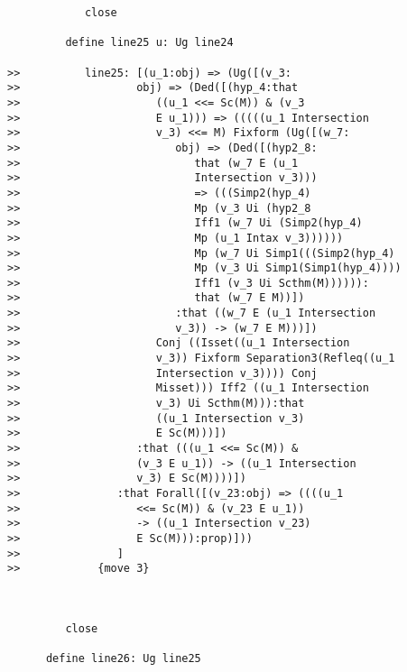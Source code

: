 \documentclass[12pt]{article}
\begin{document}
\begin{verbatim}
            close

         define line25 u: Ug line24

>>          line25: [(u_1:obj) => (Ug([(v_3:
>>                  obj) => (Ded([(hyp_4:that
>>                     ((u_1 <<= Sc(M)) & (v_3
>>                     E u_1))) => (((((u_1 Intersection
>>                     v_3) <<= M) Fixform (Ug([(w_7:
>>                        obj) => (Ded([(hyp2_8:
>>                           that (w_7 E (u_1
>>                           Intersection v_3)))
>>                           => (((Simp2(hyp_4)
>>                           Mp (v_3 Ui (hyp2_8
>>                           Iff1 (w_7 Ui (Simp2(hyp_4)
>>                           Mp (u_1 Intax v_3))))))
>>                           Mp (w_7 Ui Simp1(((Simp2(hyp_4)
>>                           Mp (v_3 Ui Simp1(Simp1(hyp_4))))
>>                           Iff1 (v_3 Ui Scthm(M)))))):
>>                           that (w_7 E M))])
>>                        :that ((w_7 E (u_1 Intersection
>>                        v_3)) -> (w_7 E M)))])
>>                     Conj ((Isset((u_1 Intersection
>>                     v_3)) Fixform Separation3(Refleq((u_1
>>                     Intersection v_3)))) Conj
>>                     Misset))) Iff2 ((u_1 Intersection
>>                     v_3) Ui Scthm(M))):that
>>                     ((u_1 Intersection v_3)
>>                     E Sc(M)))])
>>                  :that (((u_1 <<= Sc(M)) &
>>                  (v_3 E u_1)) -> ((u_1 Intersection
>>                  v_3) E Sc(M))))])
>>               :that Forall([(v_23:obj) => ((((u_1
>>                  <<= Sc(M)) & (v_23 E u_1))
>>                  -> ((u_1 Intersection v_23)
>>                  E Sc(M))):prop)]))
>>               ]
>>            {move 3}



         close

      define line26: Ug line25


\end{verbatim}
\end{document}
